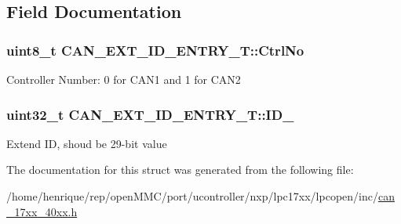 \subsection{Field Documentation}
\hypertarget{structCAN__EXT__ID__ENTRY__T_ad8ed0ed8438c467abe045573bd079190}{
\subsubsection[{Ctrl\-No}]{\setlength{\rightskip}{0pt plus 5cm}uint8\-\_\-t C\-A\-N\-\_\-\-E\-X\-T\-\_\-\-I\-D\-\_\-\-E\-N\-T\-R\-Y\-\_\-\-T\-::\-Ctrl\-No}}\label{structCAN__EXT__ID__ENTRY__T_ad8ed0ed8438c467abe045573bd079190}
Controller Number\-: 0 for C\-A\-N1 and 1 for C\-A\-N2 \hypertarget{structCAN__EXT__ID__ENTRY__T_a3e67827310c81e3e17cb067dd25155b3}{
\subsubsection[{I\-D\-\_\-29}]{\setlength{\rightskip}{0pt plus 5cm}uint32\-\_\-t C\-A\-N\-\_\-\-E\-X\-T\-\_\-\-I\-D\-\_\-\-E\-N\-T\-R\-Y\-\_\-\-T\-::\-I\-D\-\_}}\label{structCAN__EXT__ID__ENTRY__T_a3e67827310c81e3e17cb067dd25155b3}
Extend I\-D, shoud be 29-\/bit value 

The documentation for this struct was generated from the following file\-:\begin{DoxyCompactItemize}
\item 
/home/henrique/rep/open\-M\-M\-C/port/ucontroller/nxp/lpc17xx/lpcopen/inc/\hyperlink{can__17xx__40xx_8h}{can\-\_\-17xx\-\_\-40xx.\-h}\end{DoxyCompactItemize}

